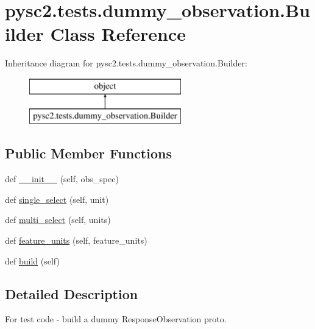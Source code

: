 \hypertarget{classpysc2_1_1tests_1_1dummy__observation_1_1_builder}{}\section{pysc2.\+tests.\+dummy\+\_\+observation.\+Builder Class Reference}
\label{classpysc2_1_1tests_1_1dummy__observation_1_1_builder}
Inheritance diagram for pysc2.\+tests.\+dummy\+\_\+observation.\+Builder\+:\begin{figure}[H]
\begin{center}
\leavevmode
\includegraphics[height=2.000000cm]{classpysc2_1_1tests_1_1dummy__observation_1_1_builder}
\end{center}
\end{figure}
\subsection*{Public Member Functions}
\begin{DoxyCompactItemize}
\item 
def \mbox{\hyperlink{classpysc2_1_1tests_1_1dummy__observation_1_1_builder_a6605dc28807b3a5ecf40cbbb1f4efe49}{\+\_\+\+\_\+init\+\_\+\+\_\+}} (self, obs\+\_\+spec)
\item 
def \mbox{\hyperlink{classpysc2_1_1tests_1_1dummy__observation_1_1_builder_abc12bdd5824b2fb1c4ad73f49d9a24c2}{single\+\_\+select}} (self, unit)
\item 
def \mbox{\hyperlink{classpysc2_1_1tests_1_1dummy__observation_1_1_builder_abd244158d236d9f802b95119b8aca326}{multi\+\_\+select}} (self, units)
\item 
def \mbox{\hyperlink{classpysc2_1_1tests_1_1dummy__observation_1_1_builder_aa93d367215f3fdc8aa7adae07999577a}{feature\+\_\+units}} (self, feature\+\_\+units)
\item 
def \mbox{\hyperlink{classpysc2_1_1tests_1_1dummy__observation_1_1_builder_ab74de5b9e8e2073e12b5712a90cea67d}{build}} (self)
\end{DoxyCompactItemize}


\subsection{Detailed Description}
\begin{DoxyVerb}For test code - build a dummy ResponseObservation proto.\end{DoxyVerb}
 

